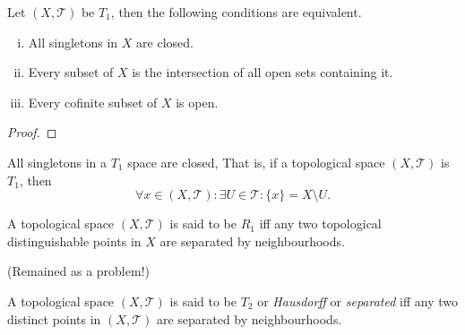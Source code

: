 \begin{proposition}
	\label{prop: alternative definitions of T_1 spaces}
	Let $(X, \mathcal T)$ be $T_1$, then the following conditions are equivalent.
	\begin{enumerate}[(i)]
		\item All singletons in $X$ are closed.
		\item Every subset of $X$ is the intersection of all open sets containing it.
		\item Every cofinite subset of $X$ is open.
	\end{enumerate}
	
	\begin{proof}
		
	\end{proof}
\end{proposition}


\begin{proposition}
	\label{prop: all singletons in a T_1 space are closed}
	
	All singletons in a $T_1$ space are closed, That is, if a topological space $(X, \mathcal T)$ is $T_1$, then
	$$
	\forall x \in (X, \mathcal T) : \exists U \in \mathcal T : \{x\} = X \setminus U.
	$$
\end{proposition}


\begin{definition}
	[$R_1$ spaces]
	\label{def: R_1 spaces}
	A topological space $(X, \mathcal T)$ is said to be $R_1$ iff any two topological distinguishable points in $X$ are separated by neighbourhoods.
\end{definition}


\begin{example}
	\label{eg: R_0 but not R_1}
	(Remained as a problem!)
\end{example}


\begin{definition}
	[$T_2$ spaces]
	\label{def: T_2 spaces}
	A topological space $(X, \mathcal T)$ is said to be $T_2$ or \textit{Hausdorff} or \textit{separated} iff any two distinct points in $(X, \mathcal T)$ are separated by neighbourhoods.
\end{definition}


